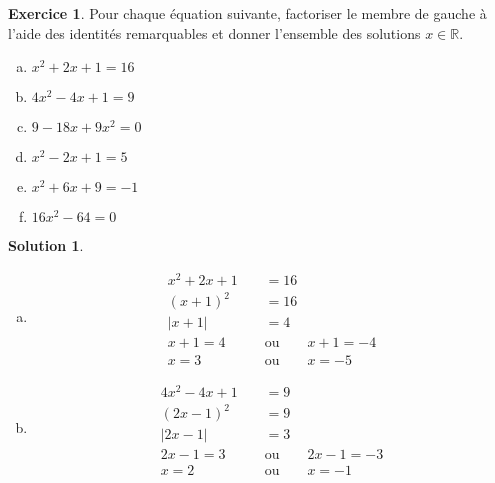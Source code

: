 \documentclass[a4paper, 14pt]{extarticle}
\theoremstyle{plain}
\newtheorem*{sol}{Solution}
\theoremstyle{definition}
\newtheorem{ex}{Exercice}
\newcommand{\R}{\mathbb{R}}
\newcommand{\exe}[2]{
		\begin{ex} #1  \end{ex}
		\begin{sol} #2 \end{sol}
	}
\newcommand{\exe}[2]{
		\begin{ex} #1  \end{ex}
	}
\begin{document}
	\exe{
		Pour chaque équation suivante, factoriser le membre de gauche à l'aide des identités remarquables et donner l'ensemble des solutions $x\in\R$.
			\begin{multicols}{2}
			\begin{enumerate}[a)]
				\item $x^2 + 2x + 1 = 16$
				\item $4x^2 - 4x + 1 = 9$
				\item $9 - 18x + 9x^2 = 0$
				\item $x^2 - 2x + 1 = 5$
				\item $x^2 +6x + 9 = -1$
				\item $16x^2 - 64 = 0$
			\end{enumerate}
			\end{multicols}
	}{
	
		\begin{enumerate}[a)]
			\item 
			\begin{align*}
				x^2 + 2x + 1 &= 16 \\
				(x+1)^2 &= 16 \\
				|x+1| &= 4 \\
				x+1=4 \qquad & \text{ou} \qquad x+1=-4 \\
				x=3 \qquad & \text{ou} \qquad x=-5
			\end{align*}
			\item
			\begin{align*}
				4x^2 - 4x + 1 &= 9 \\
				(2x-1)^2 &= 9 \\
				|2x-1| &= 3 \\
				2x-1=3 \qquad & \text{ou} \qquad 2x-1=-3 \\
				x=2 \qquad & \text{ou} \qquad x=-1
			\end{align*}
			 

\end{enumerate}}
\end{document}
